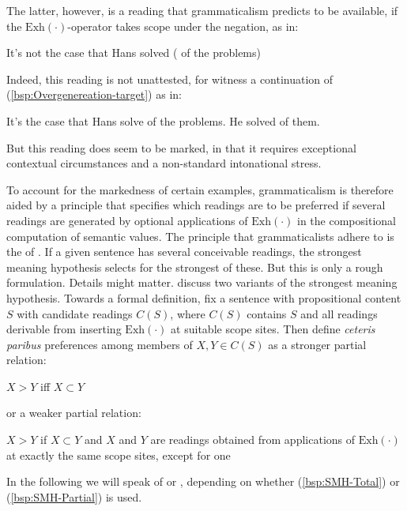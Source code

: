 \documentclass[fleqn,reqno,10pt,draft]{article}
\newcommand{\exh}{\ensuremath{\mathrm{Exh}}}
\begin{document}
\noindent The latter, however, is a reading that grammaticalism
predicts to be available, if the $\exh(\cdot)$-operator takes scope
under the negation, as in:

\begin{exe}
\ex It's not the case that Hans solved \mymark{$\exh$}( of the problems)
\end{exe}

\noindent Indeed, this reading is not unattested, for witness a
continuation of (\ref{bsp:Overgenereation-target}) as in:
\begin{exe}
\ex \label{bsp:Overgeneration-continued} It's  the case that Hans
  solve  of the problems. He solved
   of them.
\end{exe}

\noindent But this reading does seem to be marked, in that it requires
exceptional contextual circumstances and a non-standard intonational
stress. 

To account for the markedness of certain examples, grammaticalism is
therefore aided by a principle that specifies which readings are to be
preferred if several readings are generated by optional applications
of $\exh(\cdot)$ in the compositional computation of semantic
values. The principle that grammaticalists adhere to
\citep[c.f.][]{FoxSpector:Economy-and-Emb,ChierchiaFox2008:The-Grammatical,Chierchia2012:FC-Nominals-and}
is the  of
\citet{DalrympleKanazawa1998:Reciprocal-Expr}. If a given sentence has
several conceivable readings, the strongest meaning hypothesis selects
for the strongest of these. But this is only a rough
formulation. Details might
matter. \citet{ChierchiaFox2008:The-Grammatical} discuss two variants
of the strongest meaning hypothesis. Towards a formal definition, fix
a sentence with propositional content $S$ with candidate readings
$C(S)$, where $C(S)$ contains $S$ and all readings derivable from
inserting $\exh(\cdot)$ at suitable scope sites.  Then define
\emph{ceteris paribus} preferences among members of $X,Y \in C(S)$ as
a stronger partial relation:
\begin{exe}
\ex \label{bsp:SMH-Total} 
  $X > Y$ iff $X \subset Y$ 
\end{exe}
or a weaker partial relation:
\begin{exe}
\ex \label{bsp:SMH-Partial}  $X > Y$ if $X \subset Y$ and $X$ and $Y$ are readings obtained
  from applications of $\exh(\cdot)$ at exactly the same scope sites,
  except for one 
\end{exe}
In the following we will speak of  or
, depending on whether
(\ref{bsp:SMH-Total}) or (\ref{bsp:SMH-Partial}) is used.
\end{document}
